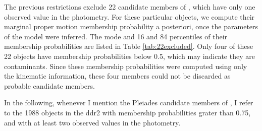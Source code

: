 The previous restrictions exclude 22 candidate members of \citet{Bouy2015}, which have only one observed value in the photometry. For these particular objects, we compute their marginal proper motion membership probability a posteriori, once the parameters of the model were inferred. The mode and 16 and 84 percentiles of their membership probabilities are listed in Table \ref{tab:22excluded}. Only four of these 22 objects have membership probabilities below 0.5, which may indicate they are contaminants. Since these membership probabilities were computed using only the kinematic information, these four members could not be discarded as probable candidate members.

In the following, whenever I mention the Pleiades candidate members of \citet{Bouy2015}, I refer to the 1988 objects in the \gls{ddr2} with \citet{Bouy2015} membership probabilities grater than 0.75, and with at least two observed values in the photometry.

